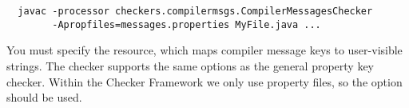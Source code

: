\begin{Verbatim}
  javac -processor checkers.compilermsgs.CompilerMessagesChecker
        -Apropfiles=messages.properties MyFile.java ...
\end{Verbatim}

You must specify the resource, which maps compiler message keys to user-visible
strings.  The checker supports the same options as the general property key checker.
Within the Checker Framework we only use property files,
so the  option should be used.


